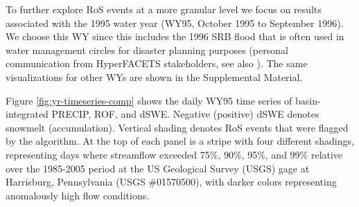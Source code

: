 \documentclass[nhess, manuscript]{copernicus}
\begin{document}

To further explore RoS events at a more granular level we focus on results associated with the 1995 water year (WY95, October 1995 to September 1996). 
We choose this WY since this includes the 1996 SRB flood that is often used in water management circles for disaster planning purposes (personal communication from HyperFACETS stakeholders, see also \citet{jagannathan2021the}). 
The same visualizations for other WYs are shown in the Supplemental Material.

Figure \ref{fig:yr-timeseries-comp} shows the daily WY95 time series of basin-integrated PRECIP, ROF, and dSWE.
Negative (positive) dSWE denotes snowmelt (accumulation). 
Vertical shading denotes RoS events that were flagged by the algorithm. 
At the top of each panel is a stripe with four different shadings, representing days where streamflow exceeded 75\%, 90\%, 95\%, and 99\% relative over the 1985-2005 period at the US Geological Survey (USGS) gage at Harrisburg, Pennsylvania (USGS \#01570500), with darker colors representing anomalously high flow conditions.
\end{document}
